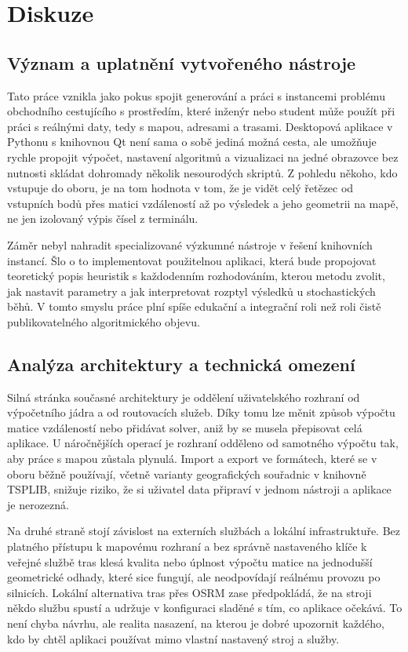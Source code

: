 \chapter{Diskuze}

\section{Význam a uplatnění vytvořeného nástroje}

Tato práce vznikla jako pokus spojit generování a práci s instancemi problému obchodního cestujícího s prostředím, které inženýr nebo student může použít při práci s reálnými daty, tedy s mapou, adresami a trasami. Desktopová aplikace v Pythonu s knihovnou Qt není sama o sobě jediná možná cesta, ale umožňuje rychle propojit výpočet, nastavení algoritmů a vizualizaci na jedné obrazovce bez nutnosti skládat dohromady několik nesourodých skriptů. Z pohledu někoho, kdo vstupuje do oboru, je na tom hodnota v tom, že je vidět celý řetězec od vstupních bodů přes matici vzdáleností až po výsledek a jeho geometrii na mapě, ne jen izolovaný výpis čísel z terminálu.

Záměr nebyl nahradit specializované výzkumné nástroje v řešení knihovních instancí. Šlo o to implementovat použitelnou aplikaci, která bude propojovat teoretický popis heuristik s každodenním rozhodováním, kterou metodu zvolit, jak nastavit parametry a jak interpretovat rozptyl výsledků u stochastických běhů. V tomto smyslu práce plní spíše edukační a integrační roli než roli čistě publikovatelného algoritmického objevu.

\section{Analýza architektury a technická omezení}

Silná stránka současné architektury je oddělení uživatelského rozhraní od výpočetního jádra a od routovacích služeb. Díky tomu lze měnit způsob výpočtu matice vzdáleností nebo přidávat solver, aniž by se musela přepisovat celá aplikace. U náročnějších operací je rozhraní odděleno od samotného výpočtu tak, aby práce s mapou zůstala plynulá. Import a export ve formátech, které se v oboru běžně používají, včetně varianty geografických souřadnic v knihovně TSPLIB, snižuje riziko, že si uživatel data připraví v jednom nástroji a aplikace je nerozezná.

Na druhé straně stojí závislost na externích službách a lokální infrastruktuře. Bez platného přístupu k mapovému rozhraní a bez správně nastaveného klíče k veřejné službě tras klesá kvalita nebo úplnost výpočtu matice na jednodušší geometrické odhady, které sice fungují, ale neodpovídají reálnému provozu po silnicích. Lokální alternativa tras přes OSRM zase předpokládá, že na stroji někdo službu spustí a udržuje v konfiguraci sladěné s tím, co aplikace očekává. To není chyba návrhu, ale realita nasazení, na kterou je dobré upozornit každého, kdo by chtěl aplikaci používat mimo vlastní nastavený stroj a služby.

